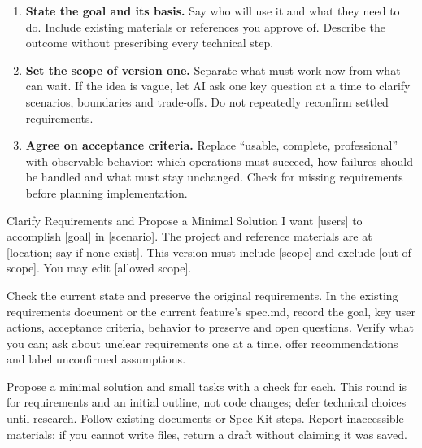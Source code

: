 \begin{enumerate}
\item \textbf{State the goal and its basis.} Say who will use it and what they need to do. Include existing materials or references you approve of. Describe the outcome without prescribing every technical step.
\item \textbf{Set the scope of version one.} Separate what must work now from what can wait. If the idea is vague, let AI ask one key question at a time to clarify scenarios, boundaries and trade-offs. Do not repeatedly reconfirm settled requirements.
\item \textbf{Agree on acceptance criteria.} Replace ``usable, complete, professional'' with observable behavior: which operations must succeed, how failures should be handled and what must stay unchanged. Check for missing requirements before planning implementation.
\end{enumerate}
\begin{prompt}{Clarify Requirements and Propose a Minimal Solution}
I want [users] to accomplish [goal] in [scenario]. The project and reference materials are at [location; say if none exist]. This version must include [scope] and exclude [out of scope]. You may edit [allowed scope].\par
Check the current state and preserve the original requirements. In the existing requirements document or the current feature's spec.md, record the goal, key user actions, acceptance criteria, behavior to preserve and open questions. Verify what you can; ask about unclear requirements one at a time, offer recommendations and label unconfirmed assumptions.\par
Propose a minimal solution and small tasks with a check for each. This round is for requirements and an initial outline, not code changes; defer technical choices until research. Follow existing documents or Spec Kit steps. Report inaccessible materials; if you cannot write files, return a draft without claiming it was saved.
\end{prompt}
